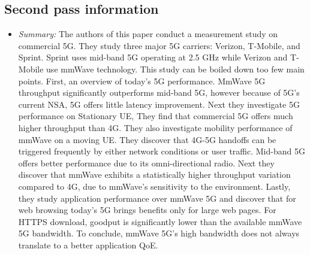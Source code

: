 \documentclass[letterpaper,twocolumn,10pt]{article}
\begin{document}
\subsection{Second pass information}
\label{sec:second}
\begin{itemize}

\item {\it Summary:} 
The authors of this paper conduct a measurement study on commercial 5G. They study three major 5G carriers: 
Verizon, T-Mobile, and Sprint. Sprint uses mid-band 5G operating at 2.5 GHz while Verizon and T-Mobile use 
mmWave technology. This study can be boiled down too few main points. First, an overview of 
today's 5G performance. MmWave 5G throughput significantly outperforms mid-band 5G, however because of 
5G's current NSA, 5G offers little latency improvement. Next they investigate 5G performance on Stationary UE,
They find that commercial 5G offers much higher throughput than 4G. They also investigate mobility performance
of mmWave on a moving UE. They discover that 4G-5G handoffs can be triggered frequently by either network
conditions or user traffic. Mid-band 5G offers better performance due to its omni-directional radio. Next they
discover that mmWave exhibits a statistically higher throughput variation compared to 4G, due to mmWave's
sensitivity to the environment. Lastly, they study application performance over mmWave 5G and discover that
for web browsing today's 5G brings benefits only for large web pages. For HTTPS download, goodput is 
significantly lower than the available mmWave 5G bandwidth. To conclude, mmWave 5G's high bandwidth 
does not always translate to a better application QoE. 

\end{itemize}
\end{document}
